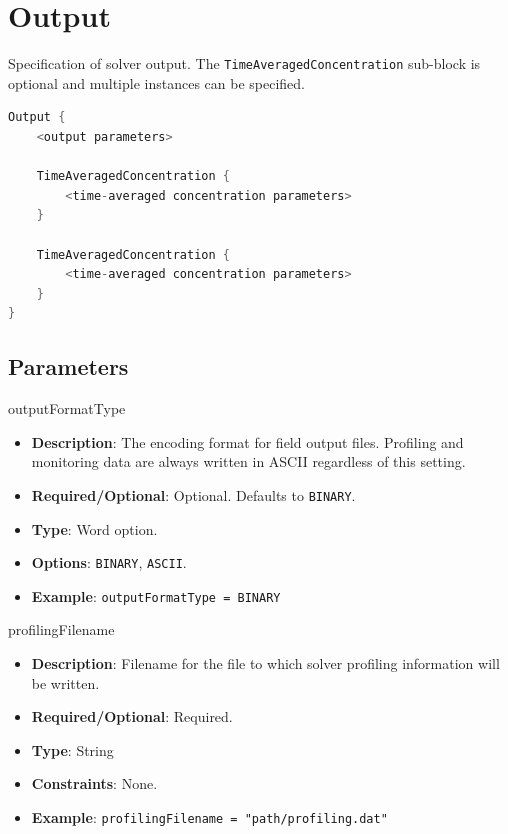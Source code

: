 \section{Output}

Specification of solver output. The \lstinline!TimeAveragedConcentration! sub-block is optional and multiple instances can be specified.

\begin{lstlisting}[language=C++]
Output {
    <output parameters>

    TimeAveragedConcentration {
        <time-averaged concentration parameters>
    }

    TimeAveragedConcentration {
        <time-averaged concentration parameters>
    }
}
\end{lstlisting}

\subsection*{Parameters}

outputFormatType
\vspace{\the\parameterListSpacing}
\begin{itemize}
    \item {\bf Description}: The encoding format for field output files. Profiling and monitoring data are always written in ASCII regardless of this setting.
    \item {\bf Required/Optional}: Optional. Defaults to \lstinline!BINARY!.
    \item {\bf Type}: Word option.
    \item {\bf Options}: \lstinline!BINARY!, \lstinline!ASCII!.
    \item {\bf Example}: \lstinline!outputFormatType = BINARY!
\end{itemize}

profilingFilename
\vspace{\the\parameterListSpacing}
\begin{itemize}
    \item {\bf Description}: Filename for the file to which solver profiling information will be written.
    \item {\bf Required/Optional}: Required.
    \item {\bf Type}: String
    \item {\bf Constraints}: None.
    \item {\bf Example}: \lstinline!profilingFilename = "path/profiling.dat"!
\end{itemize}

